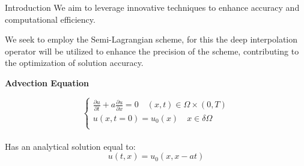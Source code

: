 \begin{frame}{Introduction}
    We aim to leverage innovative techniques to enhance accuracy and computational efficiency.
    
    \vspace{0.3cm}

    We seek to employ the Semi-Lagrangian scheme,  for this the deep interpolation operator will be utilized to enhance the precision of the scheme, contributing to the optimization of solution accuracy.

    \vspace{0.3cm}
    
    \textbf{Advection Equation}

    \begin{equation}
        \begin{cases}
        \frac{\partial u}{\partial t} + a \frac{\partial u}{\partial x} = 0 \quad (x,t) \in \Omega \times (0,T) \\
         u(x,t=0) = u_0(x) \quad x \in \delta \Omega \\
        \end{cases}
    \end{equation}
    \\

    Has an analytical solution equal to: 
    $$
    u(t, x)=u_0(x, x-at)
    $$
    
\end{frame}